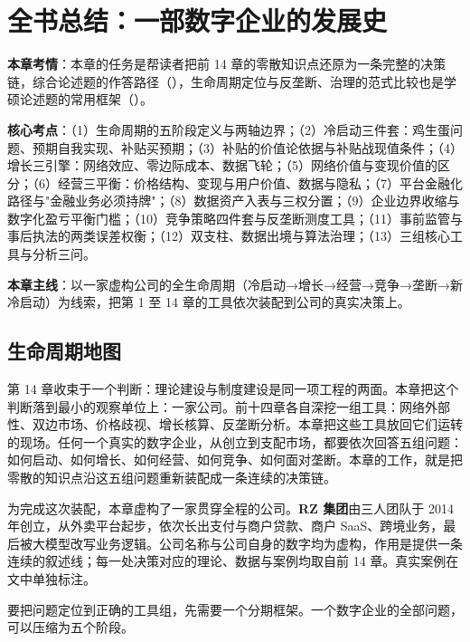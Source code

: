 \chapter{全书总结：一部数字企业的发展史}

\begin{examguide}
\textbf{本章考情}：本章的任务是帮读者把前 14 章的零散知识点还原为一条完整的决策链，综合论述题的作答路径（），生命周期定位与反垄断、治理的范式比较也是学硕论述题的常用框架（）。

\textbf{核心考点}：（1）生命周期的五阶段定义与两轴边界；（2）冷启动三件套：鸡生蛋问题、预期自我实现、补贴买预期；（3）补贴的价值论依据与补贴战现值条件；（4）增长三引擎：网络效应、零边际成本、数据飞轮；（5）网络价值与变现价值的区分；（6）经营三平衡：价格结构、变现与用户价值、数据与隐私；（7）平台金融化路径与"金融业务必须持牌"；（8）数据资产入表与三权分置；（9）企业边界收缩与数字化盈亏平衡门槛；（10）竞争策略四件套与反垄断测度工具；（11）事前监管与事后执法的两类误差权衡；（12）双支柱、数据出境与算法治理；（13）三组核心工具与分析三问。

\textbf{本章主线}：以一家虚构公司的全生命周期（冷启动→增长→经营→竞争→垄断→新冷启动）为线索，把第 1 至 14 章的工具依次装配到公司的真实决策上。
\end{examguide}

\section{生命周期地图}

第 14 章收束于一个判断：理论建设与制度建设是同一项工程的两面。本章把这个判断落到最小的观察单位上：一家公司。前十四章各自深挖一组工具：网络外部性、双边市场、价格歧视、增长核算、反垄断分析。本章把这些工具放回它们运转的现场。任何一个真实的数字企业，从创立到支配市场，都要依次回答五组问题：如何启动、如何增长、如何经营、如何竞争、如何面对垄断。本章的工作，就是把零散的知识点沿这五组问题重新装配成一条连续的决策链。

为完成这次装配，本章虚构了一家贯穿全程的公司。\textbf{RZ 集团}由三人团队于 2014 年创立，从外卖平台起步，依次长出支付与商户贷款、商户 SaaS、跨境业务，最后被大模型改写业务逻辑。公司名称与公司自身的数字均为虚构，作用是提供一条连续的叙述线；每一处决策对应的理论、数据与案例均取自前 14 章。真实案例在文中单独标注。

要把问题定位到正确的工具组，先需要一个分期框架。一个数字企业的全部问题，可以压缩为五个阶段。

